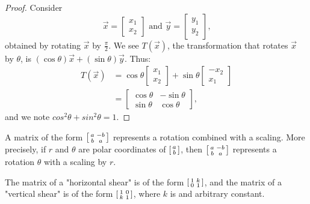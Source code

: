 \documentclass[a4paper,8pt]{article}
\begin{document}
\begin{outline}
    \begin{proof}
      Consider
      \[
        \vec{x} = \begin{bmatrix} x_1 \\ x_2 \end{bmatrix} \text{ and }
        \vec{y} = \begin{bmatrix} y_1 \\ y_2 \end{bmatrix} \text{,}
      \]
      obtained by rotating \(\vec{x}\) by \(\frac{\pi}{2}\). We see \(T(\vec{x})\),
      the transformation that rotates \(\vec{x}\) by \(\theta\), is \((\cos{\theta})\vec{x}
      + (\sin{\theta})\vec{y}\). Thus:
      \begin{align*}
        T(\vec{x}) &= \cos{\theta} \begin{bmatrix}  x_1 \\ x_2 \end{bmatrix} +
                      \sin{\theta} \begin{bmatrix} -x_2 \\ x_1 \end{bmatrix} \\
                   &= \begin{bmatrix}
                        \cos{\theta} & -\sin{\theta}           \\
                        \sin{\theta} &  \cos{\theta}
                      \end{bmatrix}\text{,}
      \end{align*}
      and we note \(cos^2\theta + sin^2\theta = 1\).
    \end{proof}

    A matrix of the form \(\begin{bsmallmatrix} a & -b \\ b & a \end{bsmallmatrix}\) represents a rotation combined
    with a scaling. More precisely, if \(r\) and \(\theta\) are polar coordinates of \(\begin{bsmallmatrix}
    a \\ b \end{bsmallmatrix}\), then \(\begin{bsmallmatrix} a & -b \\ b & a \end{bsmallmatrix}\) represents a rotation
    \(\theta\) with a scaling by \(r\).

    The matrix of a "horizontal shear" is of the form \(\begin{bsmallmatrix} 1 & k \\ 0 & 1 \end{bsmallmatrix}\), and the
    matrix of a "vertical shear" is of the form \(\begin{bsmallmatrix} 1 & 0 \\ k & 1 \end{bsmallmatrix}\), where \(k\) is
    and arbitrary constant.


\end{outline}
\end{document}
